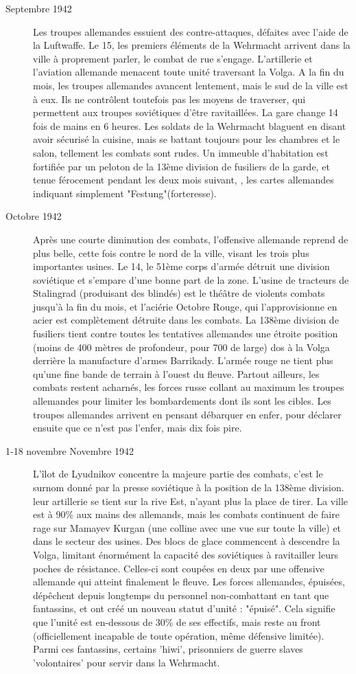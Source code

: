 \documentclass{report}
\begin{document}
\begin{multicols}{2}
\begin{description}
\item[Septembre 1942] Les troupes allemandes essuient des contre-attaques, défaites avec l'aide de la Luftwaffe. Le 15, les premiers éléments de la Wehrmacht arrivent dans la ville à proprement parler, le combat de rue s'engage. L'artillerie et l'aviation allemande menacent toute unité traversant la Volga. A la fin du mois, les troupes allemandes avancent lentement, mais le sud de la ville est à eux. Ils ne contrôlent toutefois pas les moyens de traverser, qui permettent aux troupes soviétiques d'être ravitaillées. La gare change 14 fois de mains en 6 heures. Les soldats de la Wehrmacht blaguent en disant avoir sécurisé la cuisine, mais se battant toujours pour les chambres et le salon, tellement les combats sont rudes. Un immeuble d'habitation est fortifiée par un peloton de la 13ème division de fusiliers de la garde, et tenue férocement pendant les deux mois suivant, , les cartes allemandes indiquant simplement "Festung"(forteresse).
\item[Octobre 1942]Après une courte diminution des combats, l'offensive allemande reprend de plus belle, cette fois contre le nord de la ville, visant les trois plus importantes usines. Le 14, le 51ème corps d'armée détruit une division soviétique et s'empare d'une bonne part de la zone. L'usine de tracteurs de Stalingrad (produisant des blindés) est le théâtre de violents combats jusqu'à la fin du mois, et l'aciérie Octobre Rouge, qui l'approvisionne en acier est complètement détruite dans les combats. La 138ème division de fusiliers tient contre toutes les tentatives allemandes une étroite position (moins de 400 mètres de profondeur, pour 700 de large) dos à la Volga derrière la manufacture d'armes Barrikady. L'armée rouge ne tient plus qu'une fine bande de terrain à l'ouest du fleuve. Partout ailleurs, les combats restent acharnés, les forces russe collant au maximum les troupes allemandes pour limiter les bombardements dont ils sont les cibles. Les troupes allemandes arrivent en pensant débarquer en enfer, pour déclarer ensuite que ce n'est pas l'enfer, mais dix fois pire.
\item[1-18 novembre Novembre 1942] L'îlot de Lyudnikov concentre la majeure partie des combats, c'est le surnom donné par la presse soviétique à la position de la 138ème division. leur artillerie se tient sur la rive Est, n'ayant plus la place de tirer. La ville est à 90\% aux mains des allemands, mais les combats continuent de faire rage sur Mamayev Kurgan (une colline avec une vue sur toute la ville) et dans le secteur des usines. Des blocs de glace commencent à descendre la Volga, limitant énormément la capacité des soviétiques à ravitailler leurs poches de résistance. Celles-ci sont coupées en deux par une offensive allemande qui atteint finalement le fleuve.  Les forces allemandes, épuisées, dépêchent depuis longtemps du personnel non-combattant en tant que fantassins, et ont créé un nouveau statut d'unité : "épuisé". Cela signifie que l'unité est en-dessous de 30\% de ses effectifs, mais reste au front (officiellement incapable de toute opération, même défensive limitée). Parmi ces fantassins, certains 'hiwi', prisonniers de guerre slaves 'volontaires' pour servir dans la Wehrmacht.

\end{description}
\end{multicols}
\end{document}
